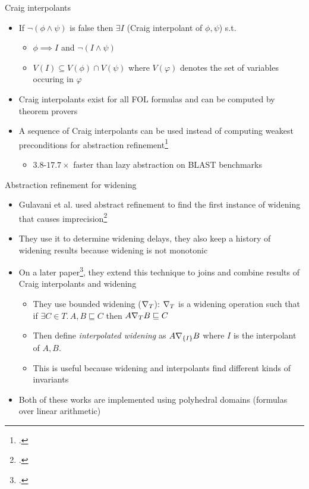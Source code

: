 \documentclass[aspectratio=169]{beamer}
\begin{document}
\begin{frame}{Craig interpolants}
  \begin{itemize}[<+->]
  \item If $\neg (\phi \wedge \psi)$ is false then $\exists I$ (Craig interpolant of $\phi, \psi$) s.t.
    \begin{itemize}[<+->]
    \item $\phi \implies I$ and $\neg (I \wedge \psi)$
    \item $V(I) \subseteq V(\phi) \cap V(\psi)$ where $V(\varphi)$ denotes the set of variables occuring in $\varphi$
    \end{itemize}
  \item Craig interpolants exist for all FOL formulas and can be computed by theorem provers
  \item A sequence of Craig interpolants can be used instead of computing weakest preconditions for abstraction refinement\footcite{mcmillan2006lazy}\pause
    \begin{itemize}
    \item $3.8$-$17.7\times$ faster than lazy abstraction on BLAST benchmarks
    \end{itemize}
  \end{itemize}
\end{frame}
\begin{frame}{Abstraction refinement for widening}
  \small
  \begin{itemize}
  \item Gulavani et al. used abstract refinement to find the first instance of widening that causes imprecision\footcite{gulavani2006counterexample}
  \item They use it to determine widening delays, they also keep a history of widening results because widening is not monotonic
  \item On a later paper\footcite{gulavani2008automatically}, they extend this technique to joins and combine results of Craig interpolants and widening
    \begin{itemize}\footnotesize
    \item They use bounded widening ($\nabla_T$): $\nabla_T$ is a widening operation such that\\ if $\exists C \in T.\, A, B \sqsubseteq C$ then $A \nabla_T B \sqsubseteq C$
    \item Then define \emph{interpolated widening} as $A \nabla_{\left\{I\right\}} B$ where $I$ is the interpolant of $A, B$.
    \item This is useful because widening and interpolants find different kinds of invariants
    \end{itemize}
  \item Both of these works are implemented using polyhedral domains (formulas over linear arithmetic)
  \end{itemize}
\end{frame}
\end{document}
